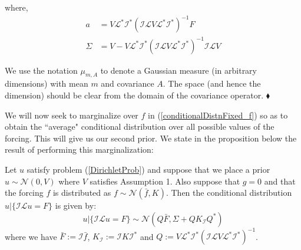 where,
\begin{align}
    \label{post_mean_before_averaging}
    a &= V\mathcal{L}^{*}\mathcal{I}^{*}(\mathcal{I}\mathcal{L}V\mathcal{L}^{*}\mathcal{I}^{*})^{-1}F \\
    \label{post_var_before_averaging}
    \Sigma &= V - V\mathcal{L}^{*}\mathcal{I}^{*}(\mathcal{I}\mathcal{L}V\mathcal{L}^{*}\mathcal{I}^{*})^{-1}\mathcal{I}\mathcal{L}V
\end{align}
\begin{remark}
We use the notation $\mu_{m,A}$ to denote a Gaussian measure (in arbitrary dimensions) with mean $m$ and covariance $A$. The space (and hence the dimension) should be clear from the domain of the covariance operator.
$\mathbin{\blacklozenge}$
\end{remark}

We will now seek to marginalize over $f$ in (\ref{conditionalDistnFixed_f}) so as to obtain the ``average" conditional distribution over all possible values of the forcing. This will give us our second prior. We state in the proposition below the result of performing this marginalization: \vspace{8pt}

\begin{proposition}
    \label{first_prop}
    Let $u$ satisfy problem (\ref{DirichletProb}) and suppose that we place a prior $u\sim\mathcal{N}(0,V)$ where $V$ satisfies Assumption 1. Also suppose that $g=0$ and that the forcing $f$ is distributed as $f\sim\mathcal{N}(\bar{f},K)$. Then the conditional distribution $u|\{\mathcal{I}\mathcal{L}u=F\}$ is given by:
    \begin{equation}
        \label{approx_prior}
        u|\{\mathcal{I}\mathcal{L}u=F\}\sim\mathcal{N}(Q\bar{F},\Sigma+QK_{\mathcal{I}}Q^{*})
    \end{equation}
    where we have $\bar{F}:=\mathcal{I}\bar{f}$, $K_{\mathcal{I}}:=\mathcal{I}K\mathcal{I}^{*}$ and $Q:=V\mathcal{L}^{*}\mathcal{I}^{*}(\mathcal{I}\mathcal{L}V\mathcal{L}^{*}\mathcal{I}^{*})^{-1}$.
\end{proposition}

